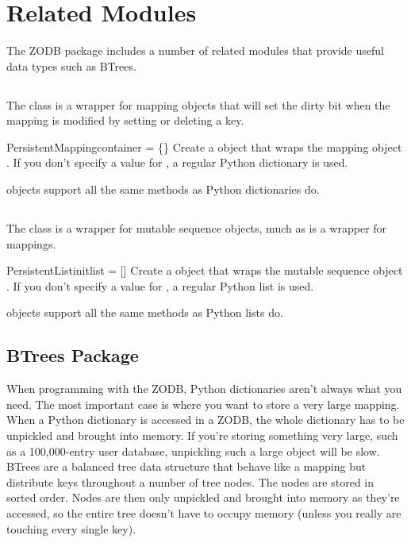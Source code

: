 

\section{Related Modules}

The ZODB package includes a number of related modules that provide
useful data types such as BTrees.

\subsection{}

The  class is a wrapper for mapping objects
that will set the dirty bit when the mapping is modified by setting or
deleting a key.  

\begin{funcdesc}{PersistentMapping}{container = \{\}}
Create a  object that wraps the 
mapping object .  If you don't specify a
value for , a regular Python dictionary is used.
\end{funcdesc}

 objects support all the same methods as 
Python dictionaries do.

\subsection{}

The  class is a wrapper for mutable sequence objects, 
much as  is a wrapper for mappings.  

\begin{funcdesc}{PersistentList}{initlist = []}
Create a  object that wraps the 
mutable sequence object .  If you don't specify a
value for , a regular Python list is used.
\end{funcdesc}

 objects support all the same methods as 
Python lists do.


\subsection{BTrees Package}

When programming with the ZODB, Python dictionaries aren't always what
you need.  The most important case is where you want to store a very
large mapping.  When a Python dictionary is accessed in a ZODB, the
whole dictionary has to be unpickled and brought into memory.  If
you're storing something very large, such as a 100,000-entry user
database, unpickling such a large object will be slow.  BTrees are a
balanced tree data structure that behave like a mapping but distribute
keys throughout a number of tree nodes.  The nodes are stored in
sorted order.  Nodes are then only unpickled and brought into memory
as they're accessed, so the entire tree doesn't have to occupy memory
(unless you really are touching every single key).

